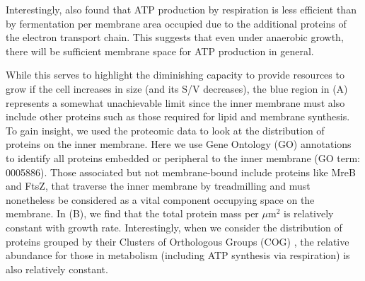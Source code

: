 Interestingly, \cite{szenk2017} also found that ATP production by
respiration is less efficient than by fermentation per membrane area occupied
due to the additional proteins of the electron transport chain. This suggests
that even under anaerobic growth, there will be sufficient membrane space for
ATP production in general.

While this serves to highlight the diminishing capacity to provide resources to
grow if the cell increases in size (and its S/V decreases), the blue region in
(A) represents a somewhat unachievable limit since the inner
membrane must also include other proteins such as those required for lipid and
membrane synthesis. To gain insight, we used the proteomic data
to look at the distribution of proteins on the inner membrane. Here we use Gene
Ontology (GO) annotations \citep{ashburner2000,thegeneOntologyconsortium2018} to
identify all proteins embedded or peripheral to the inner membrane (GO term:
0005886). Those associated but not membrane-bound include proteins like MreB and
FtsZ, that traverse the inner membrane by treadmilling and must nonetheless be
considered as a vital component occupying space on the membrane. In
 (B), we find that the total protein mass per $\mu$m$^2$ is
relatively constant with growth rate. Interestingly, when we consider the
distribution of proteins grouped by their Clusters of Orthologous Groups (COG)
\citep{tatusov2000}, the relative abundance for those in metabolism
(including ATP synthesis via respiration) is also relatively constant.

